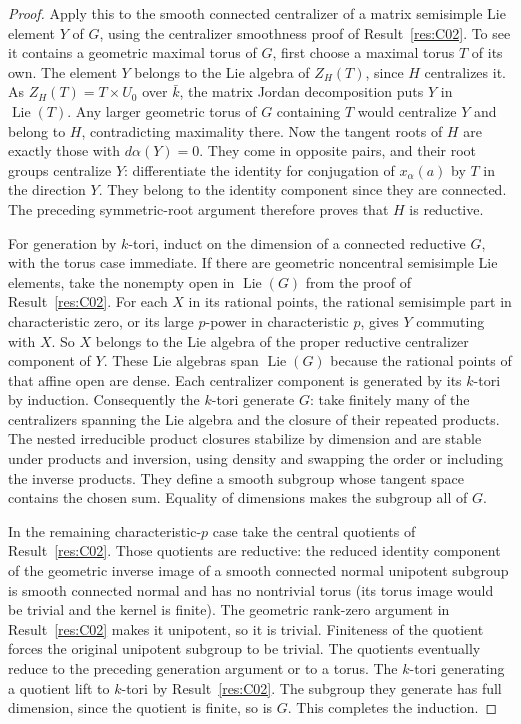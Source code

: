 \documentclass[11pt,a4paper,openany,oneside]{book}
\theoremstyle{resultstyle}
\theoremstyle{definition}
\numberwithin{equation}{chapter}
\DeclareMathOperator{\Lie}{Lie}
\begin{document}
\begin{proof}
Apply this to the smooth connected centralizer of a matrix
semisimple Lie element \(Y\) of \(G\), using the centralizer
smoothness proof of Result~\ref{res:C02}. To see it contains a
geometric maximal torus of \(G\), first choose a maximal torus
\(T\) of its own. The element \(Y\) belongs to the Lie
algebra of \(Z_H(T)\), since \(H\) centralizes it.
As \(Z_H(T)=T\times U_0\) over \(\bar k\), the matrix
Jordan decomposition puts \(Y\) in \(\Lie(T)\).
Any larger geometric torus of \(G\) containing \(T\)
would centralize \(Y\) and belong to \(H\), contradicting
maximality there. Now the tangent roots of \(H\) are exactly
those with \(d\alpha(Y)=0\). They come in opposite pairs,
and their root groups centralize \(Y\): differentiate the
identity for conjugation of \(x_\alpha(a)\) by \(T\) in the
direction \(Y\). They belong to the identity component since
they are connected. The preceding symmetric-root argument
therefore proves that \(H\) is reductive.

For generation by \(k\)-tori, induct on the dimension of a
connected reductive \(G\), with the torus case immediate.
If there are geometric noncentral semisimple Lie elements,
take the nonempty open in \(\Lie(G)\) from the proof of
Result~\ref{res:C02}. For each \(X\) in its rational points,
the rational semisimple part in characteristic zero, or its
large \(p\)-power in characteristic \(p\), gives \(Y\)
commuting with \(X\). So \(X\) belongs to the Lie algebra
of the proper reductive centralizer component of \(Y\).
These Lie algebras span \(\Lie(G)\) because the rational
points of that affine open are dense. Each centralizer
component is generated by its \(k\)-tori by induction.
Consequently the \(k\)-tori generate \(G\): take finitely
many of the centralizers spanning the Lie algebra and the
closure of their repeated products. The nested irreducible
product closures stabilize by dimension and are stable
under products and inversion, using density and swapping
the order or including the inverse products. They define
a smooth subgroup whose tangent space contains the chosen
sum. Equality of dimensions makes the subgroup all of \(G\).

In the remaining characteristic-\(p\) case take the central
quotients of Result~\ref{res:C02}. Those quotients are reductive:
the reduced identity component of the geometric inverse image
of a smooth connected normal unipotent subgroup is smooth
connected normal and has no nontrivial torus (its torus image
would be trivial and the kernel is finite). The geometric
rank-zero argument in Result~\ref{res:C02} makes it unipotent,
so it is trivial. Finiteness of the quotient forces the original
unipotent subgroup to be trivial. The quotients eventually
reduce to the preceding generation argument or to a torus.
The \(k\)-tori generating a quotient lift to \(k\)-tori
by Result~\ref{res:C02}. The subgroup they generate has
full dimension, since the quotient is finite, so is \(G\).
This completes the induction.


\end{proof}
\end{document}
